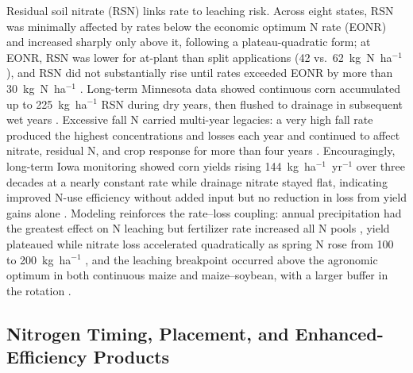 \documentclass[11pt]{article}
\begin{document}
Residual soil nitrate (RSN) links rate to leaching risk. Across eight states, RSN was minimally affected by rates below the economic optimum N rate (EONR) and increased sharply only above it, following a plateau-quadratic form; at EONR, RSN was lower for at-plant than split applications (42 vs.\ 62~kg~N~ha$^{-1}$), and RSN did not substantially rise until rates exceeded EONR by more than 30~kg~N~ha$^{-1}$ \parencite{Bandura2025}. Long-term Minnesota data showed continuous corn accumulated up to 225~kg~ha$^{-1}$ RSN during dry years, then flushed to drainage in subsequent wet years \parencite{Randall2001}. Excessive fall N carried multi-year legacies: a very high fall rate produced the highest concentrations and losses each year and continued to affect nitrate, residual N, and crop response for more than four years \parencite{Jaynes2015}. Encouragingly, long-term Iowa monitoring showed corn yields rising 144~kg~ha$^{-1}$~yr$^{-1}$ over three decades at a nearly constant rate while drainage nitrate stayed flat, indicating improved N-use efficiency without added input but no reduction in loss from yield gains alone \parencite{Clifford2023}. Modeling reinforces the rate--loss coupling: annual precipitation had the greatest effect on N leaching but fertilizer rate increased all N pools \parencite{Li2006}, yield plateaued while nitrate loss accelerated quadratically as spring N rose from 100 to 200~kg~ha$^{-1}$ \parencite{Malone2007b}, and the leaching breakpoint occurred above the agronomic optimum in both continuous maize and maize--soybean, with a larger buffer in the rotation \parencite{Pasley2021}.

\subsection{Nitrogen Timing, Placement, and Enhanced-Efficiency Products}
\end{document}

